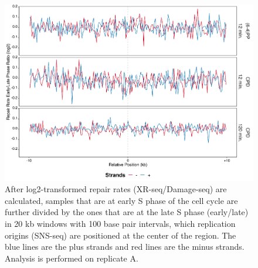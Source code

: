\begin{figure}[H]
\begin{center}
\includegraphics[width=\textwidth]{Chapters/7_appendix/figures/supfig56}
\caption[Repair rate early/late ratio of replication origins in 20 kb (replicate A).]{After log2-transformed repair rates (XR-seq/Damage-seq) are calculated, samples that are at early S phase of the cell cycle are further divided by the ones that are at the late S phase (early/late) in 20 kb windows with 100 base pair intervals, which replication origins (SNS-seq) are positioned at the center of the region. The blue lines are the plus strands and red lines are the minus strands. Analysis is performed on replicate A.}
\label{supfig:rrel20snsA}
\end{center}
\end{figure}

